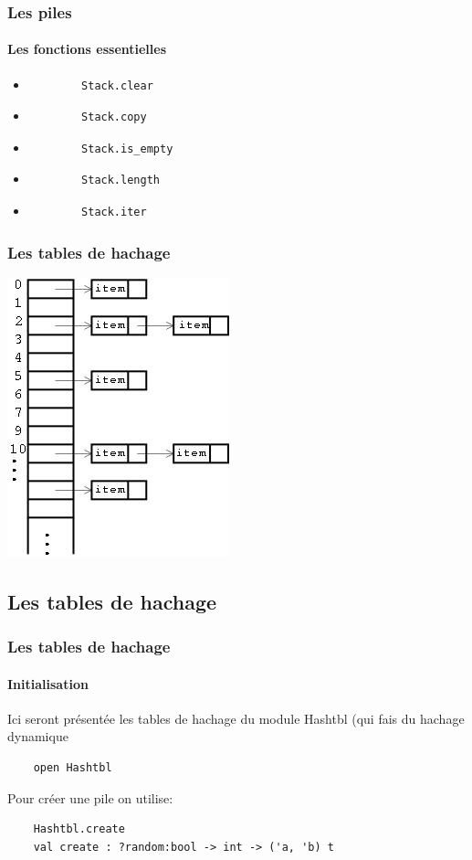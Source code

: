 \begin{frame}[fragile]
\frametitle{Les piles}
\framesubtitle{Les fonctions essentielles}
	\begin{itemize}
	
	\item
		\begin{lstlisting}
		Stack.clear
		\end{lstlisting}

	\item
		\begin{lstlisting}
		Stack.copy
		\end{lstlisting}	

	\item
		\begin{lstlisting}
		Stack.is_empty
		\end{lstlisting}	

	\item
		\begin{lstlisting}
		Stack.length
		\end{lstlisting}	

	\item
		\begin{lstlisting}
		Stack.iter
		\end{lstlisting}

	\end{itemize}

\end{frame}

\begin{frame}
	\frametitle{Les tables de hachage}
	\includegraphics[scale=0.6]{pics/hash.jpg}
\end{frame}

\subsection{Les tables de hachage}
\begin{frame}[fragile]
\frametitle{Les tables de hachage}
\framesubtitle{Initialisation}
	Ici seront présentée les tables de hachage du module Hashtbl (qui fais du hachage dynamique
	\begin{lstlisting}
	open Hashtbl
	\end{lstlisting}
	Pour créer une pile on utilise:
	\begin{lstlisting}
	Hashtbl.create
	val create : ?random:bool -> int -> ('a, 'b) t
	\end{lstlisting}
\end{frame}


